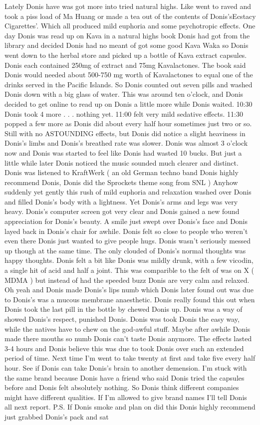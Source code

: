 \documentclass[12pt]{book}
\begin{document}
Lately Donis have was got more into tried natural highs. Like went to raved and took a piss load of Ma Huang or made a tea out of the contents of Donis'sEcstacy Cigarettes'. Which all produced mild euphoria and some psychotropic effects. One day Donis was read up on Kava in a natural highs book Donis had got from the library and decided Donis had no meant of got some good Kava Waka so Donis went down to the herbal store and picked up a bottle of Kava extract capsules. Donis each contained 250mg of extract and 75mg Kavalactones. The book said Donis would needed about 500-750 mg worth of Kavalactones to equal one of the drinks served in the Pacific Islands. So Donis counted out seven pills and washed Donis down with a big glass of water. This was around ten o'clock, and Donis decided to get online to read up on Donis a little more while Donis waited. 10:30 Donis took 4 more . . .  nothing yet. 11:00 felt very mild sedative effects. 11:30 popped a few more as Donis did about every half hour sometimes just two or so. Still with no ASTOUNDING effects, but Donis did notice a slight heaviness in Donis's limbs and Donis's breathed rate was slower. Donis was almost 3 o'clock now and Donis was started to feel like Donis had wasted 10 bucks. But just a little while later Donis noticed the music sounded much clearer and distinct. Donis was listened to KraftWerk ( an old German techno band Donis highly recommend Donis, Donis did the Sprockets theme song from SNL  ) Anyhow suddenly yet gently this rush of mild euphoria and relaxation washed over Donis and filled Donis's body with a lightness. Yet Donis's arms and legs was very heavy. Donis's computer screen got very clear and Donis gained a new found appreciation for Donis's beauty. A smile just swept over Donis's face and Donis layed back in Donis's chair for awhile. Donis felt so close to people who weren't even there Donis just wanted to give people hugs. Donis wasn't seriously messed up though at the same time. The only clouded of Donis's normal thoughts was happy thoughts. Donis felt a bit like Donis was mildly drunk, with a few vicodin, a single hit of acid and half a joint. This was comparible to the felt of was on X ( MDMA ) but instead of had the speeded buzz Donis are very calm and relaxed. Oh yeah and Donis made Donis's lips numb which Donis later found out was due to Donis's was a mucous membrane anaesthetic. Donis really found this out when Donis took the last pill in the bottle by chewed Donis up. Donis was a way of showed Donis's respect, punished Donis. Donis was took Donis the easy way, while the natives have to chew on the god-awful stuff. Maybe after awhile Donis made there mouths so numb Donis can't taste Donis anymore. The effects lasted 3-4 hours and Donis believe this was due to took Donis over such an extended period of time. Next time I'm went to take twenty at first and take five every half hour. See if Donis can take Donis's brain to another demension. I'm stuck with the same brand because Donis have a friend who said Donis tried the capsules before and Donis felt absolutely nothing. So Donis think different companies might have different qualities. If I'm allowed to give brand names I'll tell Donis all next report. P.S. If Donis smoke and plan on did this Donis highly recommend just grabbed Donis's pack and sat 
\end{document}
